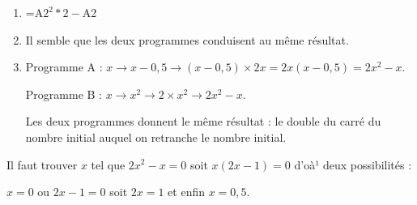 \item %

	\begin{enumerate}
		\item %
=A$2^2 *2 - $A2 
		\item %
Il semble que les deux programmes conduisent au même résultat. 
		\item %
Programme A : $x \to x - 0,5 \to (x - 0,5) \times 2x = 2x(x - 0,5) = 2x^2 - x$.

Programme B : $x \to x^2 \to 2 \times x^2 \to 2x^2 - x$.

Les deux programmes donnent le même résultat : le double du carré du nombre initial auquel on retranche le nombre initial. 
	\end{enumerate}
\item %
Il faut trouver $x$ tel que $2x^2 - x = 0$ soit $x(2x - 1) = 0$ d'oà¹ deux possibilités :

$x = 0$ ou $2x - 1 = 0$ soit $2x = 1$ et enfin $x = 0,5$.

\bigskip
 
